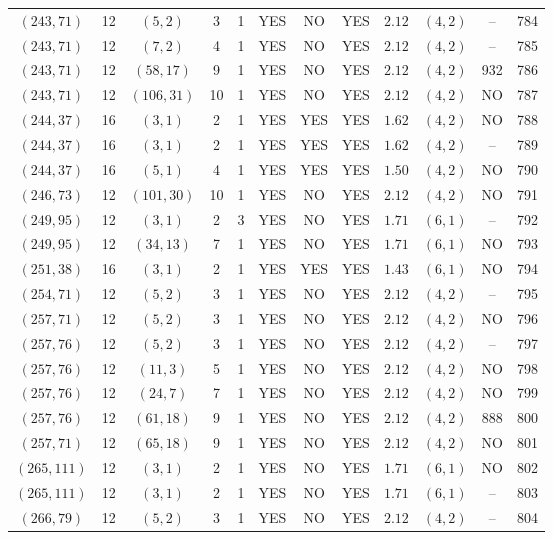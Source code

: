 \begin{longtable}{|c|c|c|c|c|c|c|c|c|c|c|c|}
$(243,71)$ & 12 & $(5,2)$ & 3 & 1 & YES & NO & YES & $2.12$ & $(4,2)$ & -- & 784\\
$(243,71)$ & 12 & $(7,2)$ & 4 & 1 & YES & NO & YES & $2.12$ & $(4,2)$ & -- & 785\\
$(243,71)$ & 12 & $(58,17)$ & 9 & 1 & YES & NO & YES & $2.12$ & $(4,2)$ & 932 & 786\\
$(243,71)$ & 12 & $(106,31)$ & 10 & 1 & YES & NO & YES & $2.12$ & $(4,2)$ & NO & 787\\
$(244,37)$ & 16 & $(3,1)$ & 2 & 1 & YES & YES & YES & $1.62$ & $(4,2)$ & NO & 788\\
$(244,37)$ & 16 & $(3,1)$ & 2 & 1 & YES & YES & YES & $1.62$ & $(4,2)$ & -- & 789\\
$(244,37)$ & 16 & $(5,1)$ & 4 & 1 & YES & YES & YES & $1.50$ & $(4,2)$ & NO & 790\\
$(246,73)$ & 12 & $(101,30)$ & 10 & 1 & YES & NO & YES & $2.12$ & $(4,2)$ & NO & 791\\
$(249,95)$ & 12 & $(3,1)$ & 2 & 3 & YES & NO & YES & $1.71$ & $(6,1)$ & -- & 792\\
$(249,95)$ & 12 & $(34,13)$ & 7 & 1 & YES & NO & YES & $1.71$ & $(6,1)$ & NO & 793\\
$(251,38)$ & 16 & $(3,1)$ & 2 & 1 & YES & YES & YES & $1.43$ & $(6,1)$ & NO & 794\\
$(254,71)$ & 12 & $(5,2)$ & 3 & 1 & YES & NO & YES & $2.12$ & $(4,2)$ & -- & 795\\
$(257,71)$ & 12 & $(5,2)$ & 3 & 1 & YES & NO & YES & $2.12$ & $(4,2)$ & NO & 796\\
$(257,76)$ & 12 & $(5,2)$ & 3 & 1 & YES & NO & YES & $2.12$ & $(4,2)$ & -- & 797\\
$(257,76)$ & 12 & $(11,3)$ & 5 & 1 & YES & NO & YES & $2.12$ & $(4,2)$ & NO & 798\\
$(257,76)$ & 12 & $(24,7)$ & 7 & 1 & YES & NO & YES & $2.12$ & $(4,2)$ & NO & 799\\
$(257,76)$ & 12 & $(61,18)$ & 9 & 1 & YES & NO & YES & $2.12$ & $(4,2)$ & 888 & 800\\
$(257,71)$ & 12 & $(65,18)$ & 9 & 1 & YES & NO & YES & $2.12$ & $(4,2)$ & NO & 801\\
$(265,111)$ & 12 & $(3,1)$ & 2 & 1 & YES & NO & YES & $1.71$ & $(6,1)$ & NO & 802\\
$(265,111)$ & 12 & $(3,1)$ & 2 & 1 & YES & NO & YES & $1.71$ & $(6,1)$ & -- & 803\\
$(266,79)$ & 12 & $(5,2)$ & 3 & 1 & YES & NO & YES & $2.12$ & $(4,2)$ & -- & 804\\

\end{longtable}
